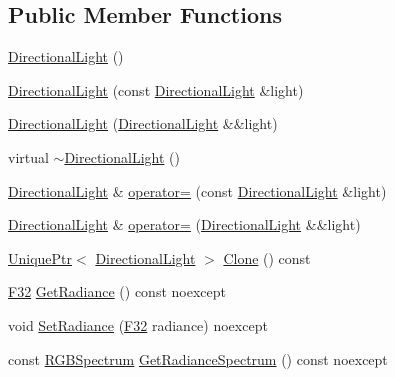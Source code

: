 \subsection*{Public Member Functions}
\begin{DoxyCompactItemize}
\item 
\hyperlink{classmage_1_1_directional_light_aa773f5b1f922b300ec91c0f7fa064b68}{Directional\+Light} ()
\item 
\hyperlink{classmage_1_1_directional_light_a777b1b8e00a51ba84f6af774a7b519ea}{Directional\+Light} (const \hyperlink{classmage_1_1_directional_light}{Directional\+Light} \&light)
\item 
\hyperlink{classmage_1_1_directional_light_a9563b260b550057e951500c40ecbe2d3}{Directional\+Light} (\hyperlink{classmage_1_1_directional_light}{Directional\+Light} \&\&light)
\item 
virtual \hyperlink{classmage_1_1_directional_light_a967d33c11a1477c01ce4c9720337caeb}{$\sim$\+Directional\+Light} ()
\item 
\hyperlink{classmage_1_1_directional_light}{Directional\+Light} \& \hyperlink{classmage_1_1_directional_light_a371d3c13d6e59c8d105da058b460874d}{operator=} (const \hyperlink{classmage_1_1_directional_light}{Directional\+Light} \&light)
\item 
\hyperlink{classmage_1_1_directional_light}{Directional\+Light} \& \hyperlink{classmage_1_1_directional_light_a508b595bf6aa5fc9db53e0a854fda41d}{operator=} (\hyperlink{classmage_1_1_directional_light}{Directional\+Light} \&\&light)
\item 
\hyperlink{namespacemage_a3316d7143a973e37adf1110f2e80ca31}{Unique\+Ptr}$<$ \hyperlink{classmage_1_1_directional_light}{Directional\+Light} $>$ \hyperlink{classmage_1_1_directional_light_a779c49e066215cff9f80ed40048dfc62}{Clone} () const
\item 
\hyperlink{namespacemage_aa97e833b45f06d60a0a9c4fc22ae02c0}{F32} \hyperlink{classmage_1_1_directional_light_a73fe73ce8184bf32379ead1e00b34c9f}{Get\+Radiance} () const noexcept
\item 
void \hyperlink{classmage_1_1_directional_light_ac8b63948d393696ca8745c799328be84}{Set\+Radiance} (\hyperlink{namespacemage_aa97e833b45f06d60a0a9c4fc22ae02c0}{F32} radiance) noexcept
\item 
const \hyperlink{structmage_1_1_r_g_b_spectrum}{R\+G\+B\+Spectrum} \hyperlink{classmage_1_1_directional_light_ac2f562fc0c5f3ff75001dfac3ff06f1c}{Get\+Radiance\+Spectrum} () const noexcept
\item 

\end{DoxyCompactItemize}
